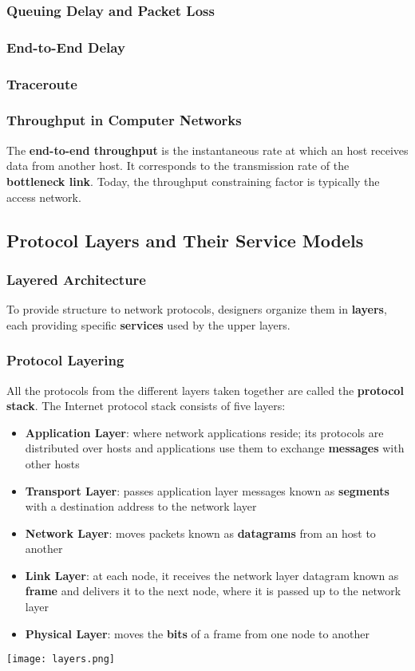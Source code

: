 \documentclass{article}
\begin{document}
\subsubsection{Queuing Delay and Packet Loss}
\subsubsection{End-to-End Delay}
\subsubsection*{Traceroute}
\subsubsection{Throughput in Computer Networks}
The \textbf{end-to-end throughput} is the instantaneous rate at which an host receives data from another host. It corresponds to the transmission rate of the \textbf{bottleneck link}. Today, the throughput constraining factor is typically the access network.

\subsection{Protocol Layers and Their Service Models}
\subsubsection{Layered Architecture}
To provide structure to network protocols, designers organize them in \textbf{layers}, each providing specific \textbf{services} used by the upper layers. 
\newpage
\subsubsection{Protocol Layering}
All the protocols from the different layers taken together are called the \textbf{protocol stack}. The Internet protocol stack consists of five layers:
\begin{itemize}
    \item \textbf{Application Layer}: where network applications reside; its protocols are distributed over hosts and applications use them to exchange \textbf{messages} with other hosts 
    \item \textbf{Transport Layer}: passes application layer messages known as \textbf{segments} with a destination address to the network layer
    \item \textbf{Network Layer}: moves packets known as \textbf{datagrams} from an host to another
    \item \textbf{Link Layer}: at each node, it receives the network layer datagram known as \textbf{frame} and delivers it to the next node, where it is passed up to the network layer 
    \item \textbf{Physical Layer}: moves the \textbf{bits} of a frame from one node to another \\
\end{itemize}
\texttt{[image: layers.png]}
\end{document}
